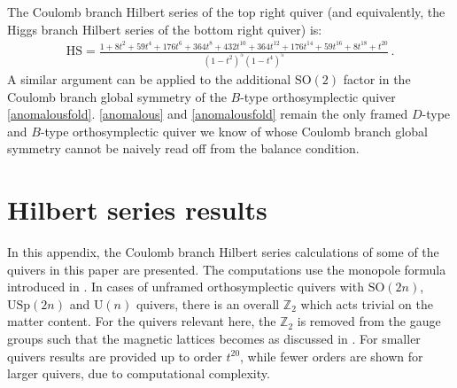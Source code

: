 \documentclass[a4paper,11pt]{article}
\newcommand{\urm}{\mathrm{U}}
\newcommand{\sorm}{\mathrm{SO}}
\begin{document}
The Coulomb branch Hilbert series of the top right quiver (and equivalently, the Higgs branch Hilbert series of the bottom right quiver) is:
\begin{align}
\mathrm{HS} = \frac{1{+}8 t^2 {+}59 t^4{+}176 t^6{+}364 t^8{+}432 t^{10}{+}364 t^{12}{+}176 t^{14}{+}59 t^{16}{+}8 t^{18}{+}t^{20}}{(1-t^2)^{5}
   \left(1-t^4\right)^5} \,.
\end{align}
A similar argument can be applied to the additional $\sorm(2)$ factor in the Coulomb branch global symmetry of the $B$-type orthosymplectic quiver \eqref{anomalousfold}.  \eqref{anomalous} and  \eqref{anomalousfold} remain the only framed $D$-type and $B$-type orthosymplectic quiver we know of whose Coulomb branch global symmetry cannot be naively read off from the balance condition. 

\section{Hilbert series results}
\label{app:HS}
In this appendix, the Coulomb branch Hilbert series calculations of some of the quivers in this paper are presented. The computations use the monopole formula introduced in \cite{Cremonesi:2013lqa}. In cases of unframed orthosymplectic quivers with $\sorm(2n)$, $\mathrm{USp}(2n)$ and $\urm(n)$ quivers, there is an overall $\mathbb{Z}_2$ which acts trivial on the matter content. For the quivers relevant here, the $\mathbb{Z}_2$ is removed from the gauge groups such that the magnetic lattices becomes as discussed in \cite{Bourget:2020xdz}. For smaller quivers results are provided up to order $t^{20}$, while fewer orders are shown for larger quivers, due to computational complexity. 
\end{document}
